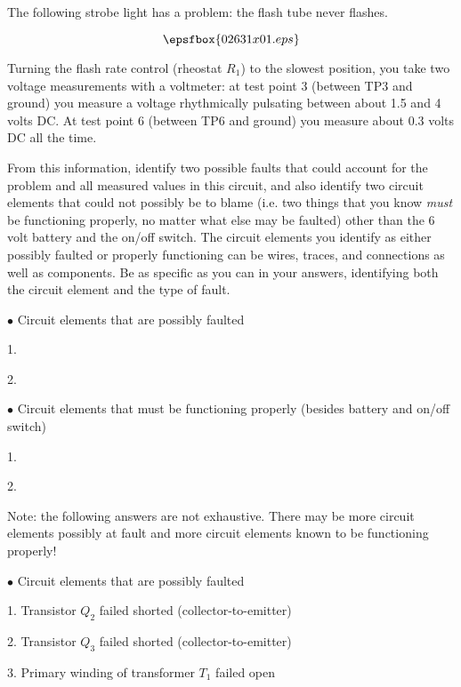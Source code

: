 

The following strobe light has a problem: the flash tube never flashes.

$$\epsfbox{02631x01.eps}$$

Turning the flash rate control (rheostat $R_1$) to the slowest position, you take two voltage measurements with a voltmeter: at test point 3 (between TP3 and ground) you measure a voltage rhythmically pulsating between about 1.5 and 4 volts DC.  At test point 6 (between TP6 and ground) you measure about 0.3 volts DC all the time.

From this information, identify two possible faults that could account for the problem and all measured values in this circuit, and also identify two circuit elements that could not possibly be to blame (i.e. two things that you know {\it must} be functioning properly, no matter what else may be faulted) other than the 6 volt battery and the on/off switch.  The circuit elements you identify as either possibly faulted or properly functioning can be wires, traces, and connections as well as components.  Be as specific as you can in your answers, identifying both the circuit element and the type of fault.

\medskip
\goodbreak
\item{$\bullet$} Circuit elements that are possibly faulted
\item{1.}
\item{2.} 
\medskip

\medskip
\goodbreak
\item{$\bullet$} Circuit elements that must be functioning properly (besides battery and on/off switch)
\item{1.} 
\item{2.} 
\medskip







Note: the following answers are not exhaustive.  There may be more circuit elements possibly at fault and more circuit elements known to be functioning properly!

\medskip
\goodbreak
\item{$\bullet$} Circuit elements that are possibly faulted
\item{1.} Transistor $Q_2$ failed shorted (collector-to-emitter)
\item{2.} Transistor $Q_3$ failed shorted (collector-to-emitter)
\item{3.} Primary winding of transformer $T_1$ failed open
\medskip

